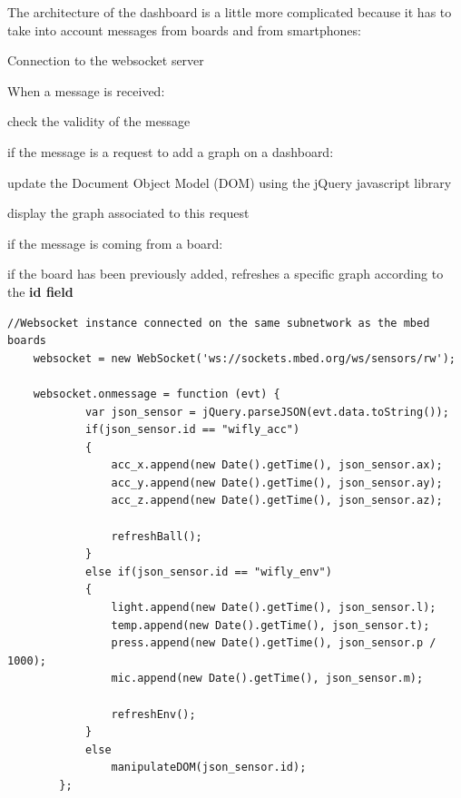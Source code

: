 \documentclass[pdftex,10pt,a4paper]{report}
\newenvironment{packed_item}{
\begin{itemize}
  \setlength{\itemsep}{1pt}
  \setlength{\parskip}{0pt}
  \setlength{\parsep}{0pt}
}{\end{itemize}}
\begin{document}
The architecture of the dashboard is a little more complicated because it has to take into account messages from boards and from smartphones:
\begin{packed_item}
	\item Connection to the websocket server
	\item When a message is received:
		\begin{packed_item}
			\item check the validity of the message
			\begin{packed_item}
				\item if the message is a request to add a graph on a dashboard:
				\begin{packed_item}
					\item update the Document Object Model (DOM) using the jQuery javascript library
					\item display the graph associated to this request
				\end{packed_item}
				\item if the message is coming from a board:
				\begin{packed_item} 
					\item if the board has been previously added, refreshes a specific graph according to the \textbf{id field}
				\end{packed_item}
			\end{packed_item}
		\end{packed_item}
\end{packed_item}


\begin{center}
\begin{lstlisting}[label=Manipulation of websocket messages by the dashboard,caption=Manipulation of websocket messages by the dashboard]
		//Websocket instance connected on the same subnetwork as the mbed boards
    websocket = new WebSocket('ws://sockets.mbed.org/ws/sensors/rw');

    websocket.onmessage = function (evt) {
			var json_sensor = jQuery.parseJSON(evt.data.toString());
			if(json_sensor.id == "wifly_acc") 
			{
				acc_x.append(new Date().getTime(), json_sensor.ax);
				acc_y.append(new Date().getTime(), json_sensor.ay);
				acc_z.append(new Date().getTime(), json_sensor.az);

				refreshBall();
			}
			else if(json_sensor.id == "wifly_env") 
			{
				light.append(new Date().getTime(), json_sensor.l);
				temp.append(new Date().getTime(), json_sensor.t);
				press.append(new Date().getTime(), json_sensor.p / 1000);
				mic.append(new Date().getTime(), json_sensor.m);

				refreshEnv();
			}
			else
				manipulateDOM(json_sensor.id);
		};
	\end{lstlisting}
\end{center}
\end{document}
